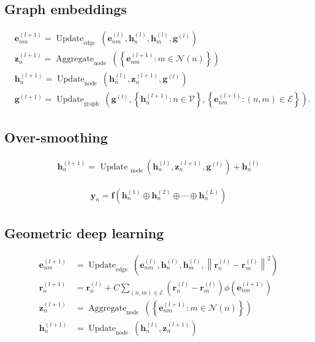 \documentclass{article}
\begin{document}
\subsection{Graph embeddings}
\begin{align*}
& \mathbf{e}_{n m}^{(l+1)}=\operatorname{Update}_{\text{edge }}\left(\mathbf{e}_{n m}^{(l)}, \mathbf{h}_{n}^{(l)}, \mathbf{h}_{m}^{(l)}, \mathbf{g}^{(l)}\right)  \tag{13.32}\\
& \mathbf{z}_{n}^{(l+1)}=\operatorname{Aggregate}_{\text{node }}\left(\left\{\mathbf{e}_{n m}^{(l+1)}: m \in \mathcal{N}(n)\right\}\right)  \tag{13.33}\\
& \mathbf{h}_{n}^{(l+1)}=\operatorname{Update}_{\text{node }}\left(\mathbf{h}_{n}^{(l)}, \mathbf{z}_{n}^{(l+1)}, \mathbf{g}^{(l)}\right)  \tag{13.34}\\
& \mathbf{g}^{(l+1)}=\operatorname{Update}_{\text{graph }}\left(\mathbf{g}^{(l)},\left\{\mathbf{h}_{n}^{(l+1)}: n \in \mathcal{V}\right\},\left\{\mathbf{e}_{n m}^{(l+1)}:(n, m) \in \mathcal{E}\right\}\right) . \tag{13.35}
\end{align*}

\subsection{Over-smoothing}
\begin{align*}
\mathbf{h}_{n}^{(l+1)}=\text{ Update }_{\text{node }}\left(\mathbf{h}_{n}^{(l)}, \mathbf{z}_{n}^{(l+1)}, \mathbf{g}^{(l)}\right)+\mathbf{h}_{n}^{(l)} \tag{13.36}
\end{align*}

\begin{align*}
\mathbf{y}_{n}=\mathbf{f}\left(\mathbf{h}_{n}^{(1)} \oplus \mathbf{h}_{n}^{(2)} \oplus \cdots \oplus \mathbf{h}_{n}^{(L)}\right) \tag{13.37}
\end{align*}

\subsection{Geometric deep learning}
\begin{align*}
\mathbf{e}_{n m}^{(l+1)} & =\operatorname{Update}_{\text{edge }}\left(\mathbf{e}_{n m}^{(l)}, \mathbf{h}_{n}^{(l)}, \mathbf{h}_{m}^{(l)},\left\|\mathbf{r}_{n}^{(l)}-\mathbf{r}_{m}^{(l)}\right\|^{2}\right)  \tag{13.38}\\
\mathbf{r}_{n}^{(l+1)} & =\mathbf{r}_{n}^{(l)}+C \sum_{(n, m) \in \mathcal{E}}\left(\mathbf{r}_{n}^{(l)}-\mathbf{r}_{m}^{(l)}\right) \phi\left(\mathbf{e}_{n m}^{(l+1)}\right)  \tag{13.39}\\
\mathbf{z}_{n}^{(l+1)} & =\operatorname{Aggregate}_{\text{node }}\left(\left\{\mathbf{e}_{n m}^{(l+1)}: m \in \mathcal{N}(n)\right\}\right)  \tag{13.40}\\
\mathbf{h}_{n}^{(l+1)} & =\operatorname{Update}_{\text{node }}\left(\mathbf{h}_{n}^{(l)}, \mathbf{z}_{n}^{(l+1)}\right) \tag{13.41}
\end{align*}
\end{document}
